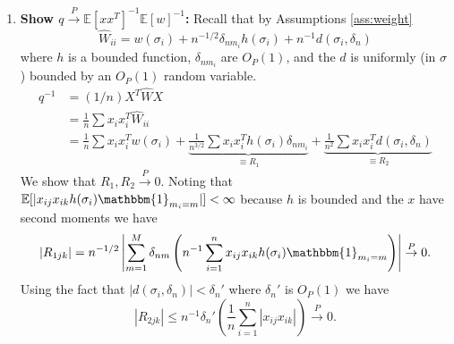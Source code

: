 \documentclass[ejs,ps,preprint]{imsart}
\numberwithin{equation}{section}
\theoremstyle{plain}
\newcommand{\E}{\mathbb{E}}
\newcommand{\ind}[1]{\mathbbm{1}_{#1}}
\newcommand{\rightarrowp}{\overset{P}{\to}}
\def\E{\mathbb{E}}
\begin{document}
\begin{enumerate}
\item \label{part:i} \textbf{Show $q \rightarrowp \E[xx^T]^{-1}\E[w]^{-1}$:} 
Recall that by Assumptions \ref{ass:weight}
\begin{equation*}
\widehat{W}_{ii} = w(\sigma_i) + n^{-1/2}\delta_{nm_i}h(\sigma_i) + n^{-1}d(\sigma_i,\delta_n)
\end{equation*}
where $h$ is a bounded function, $\delta_{nm_i}$ are $O_P(1)$, and the $d$ is uniformly (in $\sigma$) bounded by an $O_P(1)$ random variable.
\begin{align*}
q^{-1} &= (1/n)X^T\widehat{W}X\\
&= \frac{1}{n} \sum x_i x_i^T \widehat{W}_{ii}\\
&= \frac{1}{n} \sum x_i x_i^T w(\sigma_i) + \underbrace{ \frac{1}{n^{3/2}}\sum x_i x_i^Th(\sigma_i)\delta_{nm_i}}_{\equiv R_1} + \underbrace{\frac{1}{n^2}\sum x_ix_i^Td(\sigma_i,\delta_n)}_{\equiv R_2}
\end{align*}
We show that $R_1,R_2 \rightarrowp 0$. Noting that $\E[|x_{ij}x_{ik}h(\sigma_i)\ind{m_i=m}|] < \infty$ because $h$ is bounded and the $x$ have second moments we have
\begin{equation*}
|R_{1jk}| = n^{-1/2}\left|\sum_{m=1}^M \delta_{nm}\left(n^{-1}\sum_{i=1}^n x_{ij} x_{ik}h(\sigma_i)\ind{m_i=m}\right)\right| \rightarrowp 0.
\end{equation*}
Using  the fact that $|d(\sigma_i,\delta_n)| < \delta_n'$ where $\delta_n'$ is $O_P(1)$  we have
\begin{equation*}
|R_{2jk}| \leq n^{-1}\delta_n' \left(\frac{1}{n} \sum_{i=1}^n |x_{ij}x_{ik}|\right) \rightarrowp 0.
\end{equation*}


\end{enumerate}
\end{document}
